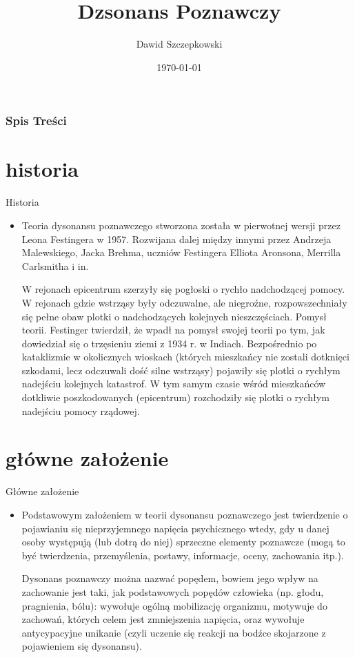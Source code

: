 \documentclass{beamer}
\title{Dzsonans Poznawczy}
\author{Dawid Szczepkowski}
\institute{UWM}
\date{\today}
\begin{document}
\frame{\titlepage}



\begin{frame}
\frametitle{Spis Treści}
\tableofcontents
\end{frame}



\section{historia}
\begin{frame}{Historia}
\begin{itemize}
\item{Teoria dysonansu poznawczego stworzona została w pierwotnej wersji przez Leona Festingera w 1957. Rozwijana dalej między innymi przez Andrzeja Malewskiego, Jacka Brehma, uczniów Festingera Elliota Aronsona, Merrilla Carlsmitha i in.


W rejonach epicentrum szerzyły się pogłoski o rychło nadchodzącej pomocy. W rejonach gdzie wstrząsy były odczuwalne, ale niegroźne, rozpowszechniały się pełne obaw plotki o nadchodzących kolejnych nieszczęściach.
Pomysł teorii. Festinger twierdził, że wpadł na pomysł swojej teorii po tym, jak dowiedział się o trzęsieniu ziemi z 1934 r. w Indiach. Bezpośrednio po kataklizmie w okolicznych wioskach (których mieszkańcy nie zostali dotknięci szkodami, lecz odczuwali dość silne wstrząsy) pojawiły się plotki o rychłym nadejściu kolejnych katastrof. W tym samym czasie wśród mieszkańców dotkliwie poszkodowanych (epicentrum) rozchodziły się plotki o rychłym nadejściu pomocy rządowej.}

\end{itemize}
\end{frame}

\section{główne założenie}
\begin{frame}{Główne założenie}
\begin{itemize}
\item Podstawowym założeniem w teorii dysonansu poznawczego jest twierdzenie o pojawianiu się nieprzyjemnego napięcia psychicznego wtedy, gdy u danej osoby występują (lub dotrą do niej) sprzeczne elementy poznawcze (mogą to być twierdzenia, przemyślenia, postawy, informacje, oceny, zachowania itp.).

Dysonans poznawczy można nazwać popędem, bowiem jego wpływ na zachowanie jest taki, jak podstawowych popędów człowieka (np. głodu, pragnienia, bólu): wywołuje ogólną mobilizację organizmu, motywuje do zachowań, których celem jest zmniejszenia napięcia, oraz wywołuje antycypacyjne unikanie (czyli uczenie się reakcji na bodźce skojarzone z pojawieniem się dysonansu).
\end{itemize}
\end{frame}
\end{document}
